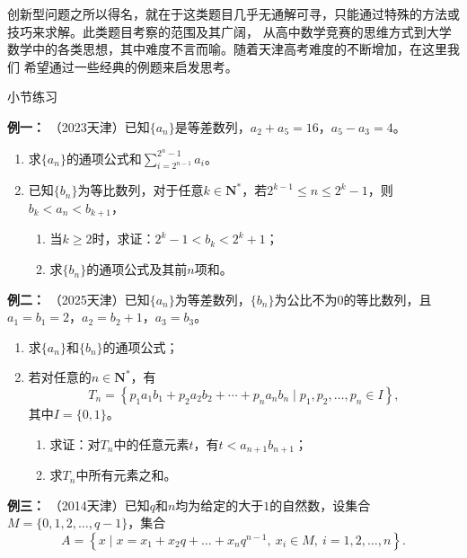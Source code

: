 \documentclass{article}
\begin{document}
创新型问题之所以得名，就在于这类题目几乎无通解可寻，只能通过特殊的方法或技巧来求解。此类题目考察的范围及其广阔，
从高中数学竞赛的思维方式到大学数学中的各类思想，其中难度不言而喻。随着天津高考难度的不断增加，在这里我们
希望通过一些经典的例题来启发思考。
\vspace{2\baselineskip}

\begin{center}
    小节练习
    \end{center}

\noindent \textbf{例一： }（2023天津）已知$\{a_n\}$是等差数列，$a_2 + a_5 = 16$，$a_5 - a_3 = 4$。

\begin{enumerate}[label=(\Roman*)]
    \item 求$\{a_n\}$的通项公式和$\displaystyle\sum\limits_{i=2^{n-1}}^{2^n - 1} a_i$。
    
    \item 已知$\{b_n\}$为等比数列，对于任意$k\in \mathbf{N}^*$，若$2^{k-1}\le n\le 2^k - 1$，则$b_k < a_n < b_{k+1}$，
    \begin{enumerate}[label=(\roman*)]
        \item 当$k\ge 2$时，求证：$2^k - 1 < b_k < 2^k + 1$；
        \item 求$\{b_n\}$的通项公式及其前$n$项和。
    \end{enumerate}
\end{enumerate}
\vspace{14\baselineskip}

\noindent \textbf{例二： }（2025天津）已知$\{a_n\}$为等差数列，$\{b_n\}$为公比不为$0$的等比数列，且$a_1 = b_1 = 2$，$a_2 = b_2 + 1$，$a_3 = b_3$。

\begin{enumerate}[label=(\Roman*)]
    \item 求$\{a_n\}$和$\{b_n\}$的通项公式；
    \item 若对任意的$n \in \mathbf{N}^*$，有
    \[
    T_n = \left\{ p_1 a_1 b_1 + p_2 a_2 b_2 + \cdots + p_n a_n b_n \mid p_1, p_2, \dots, p_n \in I \right\},
    \]
    其中$I = \{0, 1\}$。
    \begin{enumerate}[label=(\roman*)]
        \item 求证：对$T_n$中的任意元素$t$，有$t < a_{n+1} b_{n+1}$；
        \item 求$T_n$中所有元素之和。
    \end{enumerate}
\end{enumerate}
\newpage


\noindent \textbf{例三： }（2014天津）已知$q$和$n$均为给定的大于$1$的自然数，设集合$M = \{0, 1, 2, \dots, q-1\}$，集合
\[
A = \left\{ x \mid x = x_1 + x_2 q + \dots + x_n q^{n-1},\ x_i \in M,\ i = 1, 2, \dots, n \right\}.
\]
\end{document}

